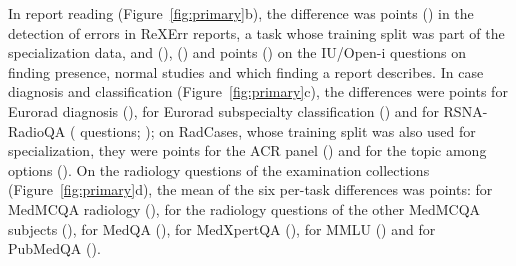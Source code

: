 In report reading (Figure~\ref{fig:primary}b), the difference was  points () in the detection of errors in ReXErr reports, a task whose training split was part of the specialization data, and  (),  () and  points () on the IU/Open-i questions on finding presence, normal studies and which finding a report describes. In case diagnosis and classification (Figure~\ref{fig:primary}c), the differences were  points for Eurorad diagnosis (),  for Eurorad subspecialty classification () and  for RSNA-RadioQA ( questions; ); on RadCases, whose training split was also used for specialization, they were  points for the ACR panel () and  for the topic among  options (). On the radiology questions of the examination collections (Figure~\ref{fig:primary}d), the mean of the six per-task differences was  points:  for MedMCQA radiology (),  for the radiology questions of the other MedMCQA subjects (),  for MedQA (),  for MedXpertQA (),  for MMLU () and  for PubMedQA ().

